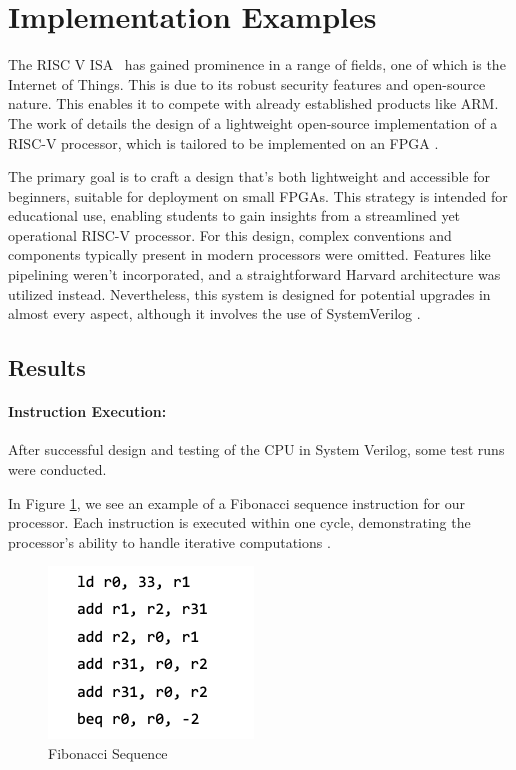 \documentclass[conference]{IEEEtran}
\begin{document}
\section{Implementation Examples}
The RISC V ISA  has gained prominence in a range of fields, one of which is the Internet of Things. This is due to its robust security features and open-source nature. This enables it to compete with already established products like ARM. The work of \cite{14} details the design of a lightweight open-source implementation of a RISC-V processor, which is tailored to be implemented on an FPGA \cite{13}.


The primary goal is to craft a design that's both lightweight and accessible for beginners, suitable for deployment on small FPGAs. This strategy is intended for educational use, enabling students to gain insights from a streamlined yet operational RISC-V processor. For this design, complex conventions and components typically present in modern processors were omitted. Features like pipelining weren't incorporated, and a straightforward Harvard architecture was utilized instead. Nevertheless, this system is designed for potential upgrades in almost every aspect, although it involves the use of SystemVerilog \cite{13}.

\subsection{Results }
\paragraph{Instruction Execution:}
After successful design and testing of the CPU in System Verilog, some test runs were conducted.

In Figure \ref{exe}, we see an example of a Fibonacci sequence instruction for our processor. Each instruction is executed within one cycle, demonstrating the processor's ability to handle iterative computations \cite{13}.

\begin{figure}[ht]
\begin{center}
  \includegraphics[scale=0.65]{Screenshot 2023-11-23 at 00.05.19 (1).png}
\end{center}
  \caption{Fibonacci Sequence\cite{13}}
  \label{exe}
\end{figure}
\end{document}
